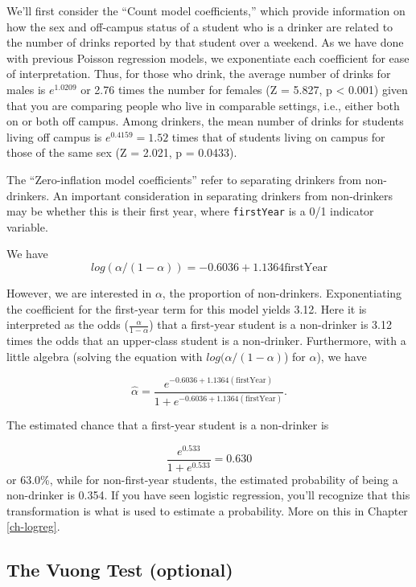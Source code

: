\documentclass[
]{krantz}
\begin{document}
We'll first consider the ``Count model coefficients,'' which provide information on how the sex and off-campus status of a student who is a drinker are related to the number of drinks reported by that student over a weekend. As we have done with previous Poisson regression models, we exponentiate each coefficient for ease of interpretation. Thus, for those who drink, the average number of drinks for males is \(e^{1.0209}\) or 2.76 times the number for females (Z = 5.827, p \textless{} 0.001) given that you are comparing people who live in comparable settings, i.e., either both on or both off campus. Among drinkers, the mean number of drinks for students living off campus is \(e^{0.4159}=1.52\) times that of students living on campus for those of the same sex (Z = 2.021, p = 0.0433).

The ``Zero-inflation model coefficients'' refer to separating drinkers from non-drinkers. An important consideration in separating drinkers from non-drinkers may be whether this is their first year, where \texttt{firstYear} is a 0/1 indicator variable.

We have
\[ 
log(\alpha/(1-\alpha)) =-0.6036+1.1364\textrm{firstYear}
 \]

However, we are interested in \(\alpha\), the proportion of non-drinkers. Exponentiating the coefficient for the first-year term for this model yields 3.12. Here it is interpreted as the odds (\(\frac{\alpha}{1-\alpha}\)) that a first-year student is a non-drinker is 3.12 times the odds that an upper-class student is a non-drinker. Furthermore, with a little algebra (solving the equation with \(log(\alpha/(1-\alpha)\)) for \(\alpha\)),
we have

\[
 \hat{\alpha} =
 \frac{e^ {-0.6036+1.1364(\textrm{firstYear})}}
 {1+e^{
 -0.6036+1.1364(\textrm{firstYear})
 }
 }.
 \]

The estimated chance that a first-year student is a non-drinker is

\[
\frac{e^{0.533}}{1+e^{0.533}} = 0.630
\]
or 63.0\%, while for non-first-year students, the estimated probability of being a non-drinker is 0.354. If you have seen logistic regression, you'll recognize that this transformation is what is used to estimate a probability. More on this in Chapter \ref{ch-logreg}.

\subsection{The Vuong Test (optional)}\label{the-vuong-test-optional}
\end{document}

